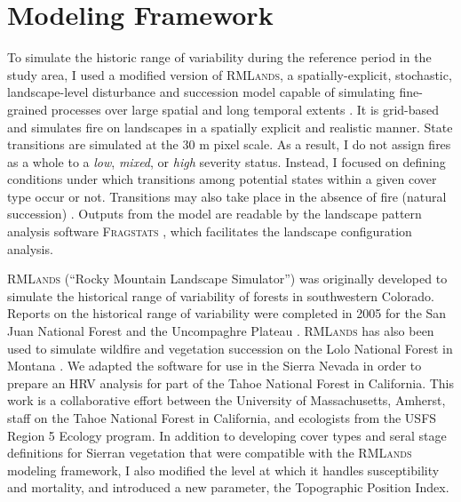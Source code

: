 \section{Modeling Framework}

To simulate the historic range of variability during the reference period in the study area, I used a modified version of \textsc{RMLands}, a spatially-explicit, stochastic, landscape-level disturbance and succession model capable of simulating fine-grained processes over large spatial and long temporal extents \citep{McGarigal2005}. It is grid-based and simulates fire on landscapes in a spatially explicit and realistic manner. State transitions are simulated at the 30 m pixel scale. As a result, I do not assign fires as a whole to a \emph{low}, \emph{mixed}, or \emph{high} severity status. Instead, I focused on defining conditions under which transitions among potential states within a given cover type occur or not. Transitions may also take place in the absence of fire (natural succession) \citep{McGarigal2012}. Outputs from the model are readable by the landscape pattern analysis software \textsc{Fragstats} \citep{Fragstats2012}, which facilitates the landscape configuration analysis.

\textsc{RMLands} (``Rocky Mountain Landscape Simulator'') was originally developed to simulate the historical range of variability of forests in southwestern Colorado. Reports on the historical range of variability were completed in 2005 for the San Juan National Forest and the Uncompaghre Plateau \citep{McGarigal2005,McGarigal2005a}. \textsc{RMLands} has also been used to simulate wildfire and vegetation succession on the Lolo National Forest in Montana \citep{Cushman2011}. We adapted the software for use in the Sierra Nevada in order to prepare an HRV analysis for part of the Tahoe National Forest in California. This work is a collaborative effort between the University of Massachusetts, Amherst, staff on the Tahoe National Forest in California, and ecologists from the USFS Region 5 Ecology program. In addition to developing cover types and seral stage definitions for Sierran vegetation that were compatible with the \textsc{RMLands} modeling framework, I also modified the level at which it handles susceptibility and mortality, and introduced a new parameter, the Topographic Position Index.





